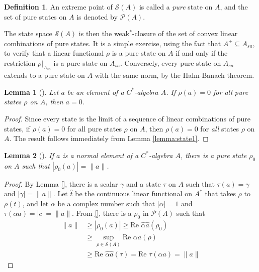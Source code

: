 \documentclass[12pt,a4paper]{report}
\theoremstyle{plain}
\newtheorem{lemma}{Lemma}
\theoremstyle{definition}
\newtheorem{defn}{Definition}
\newcommand{\1}{\mathbbm{1}}
\renewcommand{\S}{\mathscr{S}}
\renewcommand{\P}[1]{\mathscr{P}(#1)}
\begin{document}
\begin{defn}
	An extreme point of $\S(A)$ is called a \emph{pure} state on $A$, and the set of pure 
	states on $A$ is denoted by $\P{A}$.
\end{defn}
The state space $\S(A)$ is then the weak$^\ast$-closure of the set of convex linear combinations of pure 
states. 
It is a simple exercise, using the fact that $A^+\subseteq A_{sa}$, to verify that a linear 
functional $\rho$ is a pure state on $A$ if and only if the restriction $\rho|_{A_{sa}}$ is a pure
state on $A_{sa}$.
Conversely, every pure state on $A_{sa}$ extends to a pure state on $A$ with the same norm, by the 
Hahn-Banach theorem. 

\begin{lemma}[{\cite[4.3.8,(i)]{kadison83}}]\label{lemma:pure1}
	Let $a$ be an element of a $C^\ast$-algebra $A$. If $\rho(a)=0$ for all \emph{pure} states $\rho$ on 
	$A$, then $a=0$.
\end{lemma}
\begin{proof}
	Since every state is the limit of a sequence of linear combinations of pure states, if $\rho(a)=0$ 
	for all pure states $\rho$ on $A$, then $\rho(a)=0$ for \emph{all} states $\rho$ on $A$. The result 
	follows immediately from Lemma \ref{lemma:state1}.
\end{proof}
\begin{lemma}[{\cite[4.3.8,(i)]{kadison83}}]\label{lemma:pure2}
	If $a$ is a normal element of a $C^\ast$-algebra $A$, there is a pure state $\rho_0$ on $A$ such that $|\rho_0(a)|=\|a\|$.
\end{lemma}
\begin{proof}
	By Lemma \ref{}, there is a scalar $\gamma$ and a state $\tau$ on $A$ such that $\tau(a)=\gamma$ and $|\gamma|=\|a\|$. Let $\hat t$ be the continuous linear functional on $A^\ast$ that takes $\rho$ to $\rho(t)$, and let $\alpha$ be a complex number such that $|\alpha|=1$ and $\tau(\alpha a) = |c| = \|a\|$. From \ref{}, there is a $\rho_0$ in $\P A$ such that 
	\begin{align*}
				\|a\|
		&\geq 	|\rho_0(a)| \geq \mbox{Re } \widehat {\alpha a}(\rho_0)					\\
		&\geq 	\sup_{\rho\in \S(A)} \mbox{Re }\widehat {\alpha a}(\rho) 				\\
		&\geq	\mbox{Re }\widehat {\alpha a}(\tau) = \mbox{Re }\tau(\alpha a) = \|a\|	
	\end{align*}
\end{proof}
\end{document}
